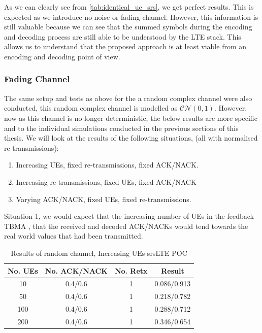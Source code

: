 \documentclass{article}
\begin{document}
As we can clearly see from \cref{tab:identical_ue_srs}, we get perfect results. This is expected as we introduce no noise or fading channel. However, this information is still valuable because we can see that the summed symbols during the encoding and decoding process are still able to be understood by the LTE stack. This allows us to understand that the proposed approach is at least viable from an encoding and decoding point of view. 

\subsubsection{Fading Channel}
The same setup and tests as above for the a random complex channel were also conducted, this random complex channel is modelled as $\mathcal{CN}(0,1)$. However, now as this channel is no longer deterministic, the below results are more specific and to the individual simulations conducted in the previous sections of this thesis. We will look at the results of the following situations, (all with normalised re transmissions):

\begin{enumerate}
    \item Increasing UEs, fixed re-transmissions, fixed ACK/NACK. 
    \item Increasing re-transmissions, fixed UEs, fixed ACK/NACK
    \item Varying ACK/NACK, fixed UEs, fixed re-transmissions.
\end{enumerate}

Situation 1, we would expect that the increasing number of UEs in the feedback TBMA , that the received and decoded ACK/NACKs would tend towards the real world values that had been transmitted. 

\begin{table}[H]
    \centering
 \begin{tabular}{||c c c c||} 
 \hline
 No. UEs & No. ACK/NACK & No. Retx & Result \\ [0.5ex] 
 \hline\hline
 10 & 0.4/0.6 & 1 &  0.086/0.913 \\ 
 \hline
 50 & 0.4/0.6 & 1 & 0.218/0.782 \\
 \hline
 100 & 0.4/0.6 & 1 & 0.288/0.712 \\
 \hline
 200 & 0.4/0.6 & 1 & 0.346/0.654 \\ [1ex] 
 \hline
\end{tabular}
    \caption{Results of random channel, Increasing UEs srsLTE POC}
    \label{tab:rand_chan_UEs_increase}
\end{table}
\end{document}
